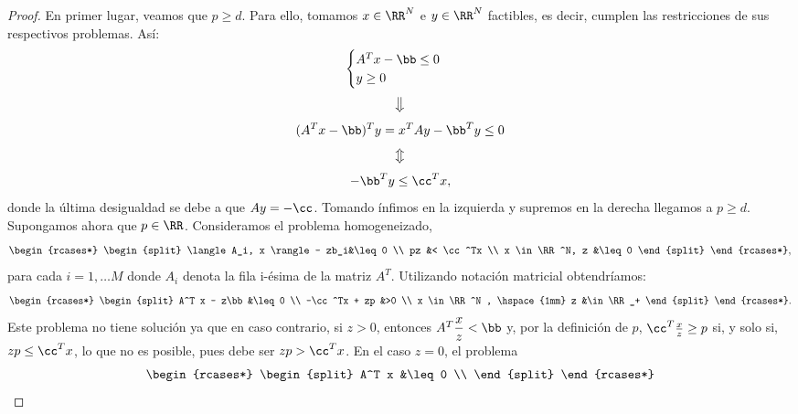 \begin{proof}
	En primer lugar, veamos que $ p \geq d $. Para ello, tomamos $ x \in \RR^N$ e $ y \in \RR^N $ factibles, es decir, cumplen las restricciones de sus respectivos problemas. Así:
	\[
	\begin{cases}
	A^T x - \bb \leq 0 \\
	y \geq 0
	\end{cases}
	\]
	\[
	\big\Downarrow
	\]
	\[
	(A^T x -\bb)^Ty =x^TAy -\bb^Ty\leq 0
	\]
	\[
	\big\Updownarrow
	\]
	\[
	-\bb^Ty\leq \cc^T x,
	\]
	donde la última desigualdad se debe a que $ Ay = -\cc $. Tomando ínfimos en la izquierda y supremos en la derecha llegamos a $ p \geq d $. \\
	
	Supongamos ahora que $ p \in \RR $. Consideramos el problema homogeneizado, 
	\begin{equation*}
	\begin{rcases*}
	\begin{split} 
	\langle A_i, x \rangle - zb_i&\leq 0  \\
	pz &< \cc^Tx \\
	x \in \RR^N, z &\leq 0
	\end{split}
	\end{rcases*},
	\end{equation*}
	para cada $ i=1,\dots M $ donde $ A_i $ denota la fila i-ésima de la matriz $ A^T $. Utilizando notación matricial obtendríamos:
	\begin{equation*}
	\begin{rcases*}
	\begin{split} 
	A^T x - z\bb&\leq 0  \\
	-\cc^Tx  + zp &>0  \\
	x \in \RR^N , \hspace{1mm} z &\in \RR_+
	\end{split}
	\end{rcases*}.
	\end{equation*} 
	Este problema no tiene solución ya que en caso contrario, si $ z > 0 $, entonces $ A^T \displaystyle \frac{x}{z} < \bb$ y, por la definición de $ p $, $ \cc^T \frac{x}{z} \geq p $ si, y solo si, $ zp \leq \cc^T x $, lo que no es posible, pues debe ser $ zp > \cc^Tx $. En el caso $ z=0 $, el problema\\
	\begin{equation}\label{eq}
	\begin{rcases*}
	\begin{split} 
	A^T x &\leq 0  \\

\end{split}
\end{rcases*}
\end{equation}
\end{proof}

